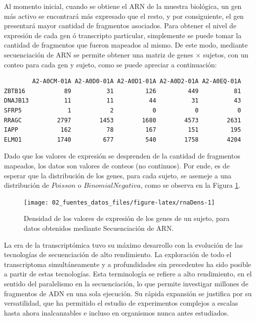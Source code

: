 \documentclass[12pt,twoside]{reedthesis}
\begin{document}
\par

Al momento inicial, cuando se obtiene el ARN de la muestra biológica, un gen más activo se encontrará más expresado que el resto, y por consiguiente, el gen presentará mayor cantidad de fragmentos asociados. Para obtener el nivel de expresión de cada gen ó transcripto particular, simplemente se puede tomar la cantidad de fragmentos que fueron mapeados al mismo. De este modo, mediante secuenciación de ARN se permite obtener una matriz de genes \(\times\) sujetos, con un conteo para cada gen y sujeto, como se puede apreciar a continuación:
\begin{verbatim}
        A2-A0CM-01A A2-A0D0-01A A2-A0D1-01A A2-A0D2-01A A2-A0EQ-01A
ZBTB16           89          31         126         449          81
DNAJB13          11          11          44          31          43
SFRP5             1           2           0           0           0
RRAGC          2797        1453        1680        4573        2631
IAPP            162          78         167         151         195
ELMO1          1740         677         540        1758        4204
\end{verbatim}
Dado que los valores de expresión se desprenden de la cantidad de fragmentos mapeados, los datos son valores de conteos (no continuos). Por ende, es de esperar que la distribución de los genes, para cada sujeto, se asemeje a una distribución de \(Poisson\) o \(Binomial Negativa\), como se observa en la Figura \ref{fig:rnaDens}.
\begin{figure}

{\centering \texttt{[image: 02\_fuentes\_datos\_files/figure-latex/rnaDens-1]} 

}

\caption{Densidad de los valores de expresión de los genes de un sujeto, para datos obtenidos mediante Secuenciación de ARN.}\label{fig:rnaDens}
\end{figure}
\par

La era de la transcriptómica tuvo su máximo desarrollo con la evolución de las tecnologías de secuenciación de alto rendimiento. La exploración de todo el transcriptoma simultáneamente y a profundidades sin precedentes ha sido posible a partir de estas tecnologías. Esta terminología se refiere a alto rendimiento, en el sentido del paralelismo en la secuenciación, lo que permite investigar millones de fragmentos de ADN en una sola ejecución. Su rápida expansión se justifica por su versatilidad, que ha permitido el estudio de experimentos complejos a escalas hasta ahora inalcanzables e incluso en organismos nunca antes estudiados.
\end{document}
